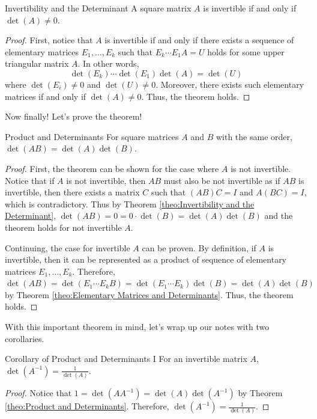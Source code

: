\documentclass[../../main.tex]{subfiles}
\begin{document}
\begin{theorem}{}{Invertibility and the Determinant}
A square matrix $A$ is invertible if and only if $\det(A) \neq 0$.
\end{theorem}
\begin{proof}
First, notice that $A$ is invertible if and only if there exists a
sequence of elementary matrices $E_1, \ldots, E_k$ such that
$E_k \cdots E_1 A = U$ holds for some upper triangular matrix $A$.
In other words,
\[
\det(E_k) \cdots \det(E_1) \det(A) = \det(U)
\]
where $\det(E_i) \neq 0$ and $\det(U) \neq 0$. Moreover, there exists
such elementary matrices if and only if $\det(A) \neq 0$. Thus, the
theorem holds.
\end{proof}

Now finally! Let's prove the theorem!

\begin{theorem}{}{Product and Determinants}
For square matrices $A$ and $B$ with the same order, $\det(AB) =
\det(A) \det(B)$.
\end{theorem}
\begin{proof}
First, the theorem can be shown for the case where $A$ is not
invertible. Notice that if $A$ is not invertible, then $AB$
must also be not invertible as if $AB$ is invertible, then
there exists a matrix $C$ such that $(AB)C = I$ and $A(BC) = I$,
which is contradictory. Thus by Theorem \ref{theo:Invertibility and
the Determinant}, $\det(AB) = 0 = 0 \cdot \det(B) = \det(A) \det(B)$
and the theorem holds for not invertible $A$.

Continuing, the case for invertible $A$ can be proven. By definition,
if $A$ is invertible, then it can be represented as a product of
sequence of elementary matrices $E_1, \ldots, E_k$. Therefore,
$\det(AB) = \det(E_1 \cdots E_k B) = \det(E_1 \cdots E_k) \det(B) =
\det(A) \det(B)$ by Theorem \ref{theo:Elementary Matrices and
Determinants}. Thus, the theorem holds.
\end{proof}

With this important theorem in mind, let's wrap up our notes with
two corollaries.

\begin{corollary}{}{Corollary of Product and Determinants I}
For an invertible matrix $A$, $\det(A^{-1}) = \frac{1}{\det(A)}$.
\end{corollary}
\begin{proof}
Notice that $1 = \det(AA^{-1}) = \det(A) \det(A^{-1})$ by Theorem
\ref{theo:Product and Determinants}. Therefore, $\det(A^{-1}) =
\frac{1}{\det(A)}$.
\end{proof}
\end{document}
